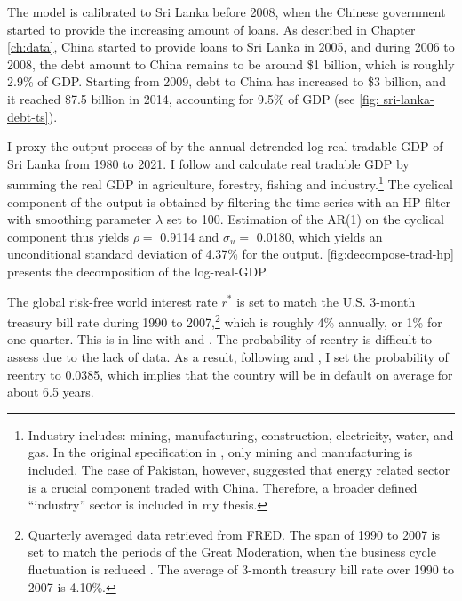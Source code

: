 The model is calibrated to Sri Lanka before 2008, when the Chinese government started to provide the increasing amount of loans.
As described in Chapter \ref{ch:data}, China started to provide loans to Sri Lanka in 2005, and during 2006 to 2008, the debt amount to China remains to be around \$1 billion, which is roughly 2.9\% of GDP. Starting from 2009, debt to China has increased to \$3 billion, and it reached \$7.5 billion in 2014, accounting for 9.5\% of GDP
(see \autoref{fig: sri-lanka-debt-ts}).

I proxy the output process of  by the annual detrended log-real-tradable-GDP of Sri Lanka from 1980 to 2021. I follow \citet{Na-18} and calculate real tradable GDP by summing the real GDP in agriculture, forestry, fishing and industry.\footnote{
    Industry includes: mining, manufacturing, construction, electricity, water, and gas. In the original specification in \citet{Na-18}, only mining and manufacturing is included. The case of Pakistan, however, suggested that energy related sector is a crucial component traded with China. Therefore, a broader defined ``industry'' sector is included in my thesis.
}
The cyclical component of the output is obtained by filtering the time series with an HP-filter with smoothing parameter $\lambda$ set to 100.
Estimation of the AR(1) on the cyclical component thus yields $\rho = $ 0.9114 and $\sigma_u = $ 0.0180, which yields an unconditional standard deviation of 4.37\% for the output.\footnotemark{} \autoref{fig:decompose-trad-hp} presents the decomposition of the log-real-GDP.

The global risk-free world interest rate $r^*$ is set to match the U.S. 3-month treasury bill rate during 1990 to 2007,\footnote{
    Quarterly averaged data retrieved from FRED. The span of 1990 to 2007 is set to match the periods of the Great Moderation, when the business cycle fluctuation is reduced \citep{FedHistory-GreatModeration}. The average of 3-month treasury bill rate over 1990 to 2007 is 4.10\%.
} which is roughly 4\% annually, or 1\% for one quarter. This is in line with \citet{Chatterjee-12} and \citet{Na-18}.
The probability of reentry is difficult to assess due to the lack of data. As a result, following \citet*{Chatterjee-12} and \citet*{Hinrichsen_2020-chapter4}, I set the probability of reentry to 0.0385, which implies that the country will be in default on average for about 6.5 years.

